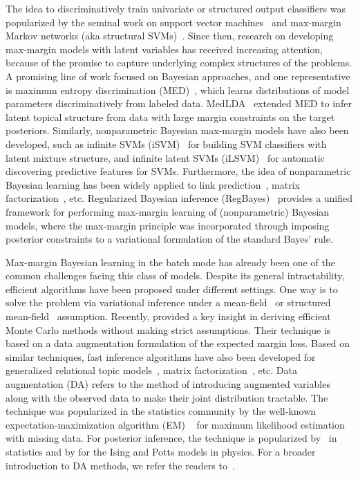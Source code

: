 \documentclass[twoside,11pt]{article}
\newcommand{\strin}[1]{\todo[size=\small, color=green!40]{\bf\sf  #1}}
\begin{document}
The idea to discriminatively train univariate or structured output classifiers was popularized by the seminal work on support vector machines~\citep{Vapnik:95} and max-margin Markov networks (aka structural SVMs)~\citep{koller2003max}. Since then, research on developing max-margin models with latent variables has received increasing attention, because of the promise to capture underlying complex structures of the problems. A promising line of work focused on Bayesian approaches, and one representative is maximum entropy discrimination (MED)~\citep{jaakkola1999maximum,jebara2001discriminative,Zhu:jmlr09}, which learns distributions of model parameters discriminatively from labeled data. MedLDA~\citep{zhu2012medlda} extended MED to infer latent topical structure from data with large margin constraints on the target posteriors. Similarly, nonparametric Bayesian max-margin models have also been developed, such as infinite SVMs (iSVM)~\citep{zhu2011infinite} for building SVM classifiers with latent mixture structure, and infinite latent SVMs (iLSVM)~\citep{zhu2013bayesian} for automatic discovering predictive features for SVMs. Furthermore, the idea of nonparametric Bayesian learning has been widely applied to link prediction~\citep{zhu2012maxlink}, matrix factorization~\citep{xu2013fast}, etc. Regularized Bayesian inference (RegBayes)~\citep{zhu2013bayesian} provides a unified framework for performing max-margin learning of (nonparametric) Bayesian models, where the max-margin principle was incorporated through imposing posterior constraints to a variational formulation of the standard Bayes' rule.

Max-margin Bayesian learning in the batch mode has already been one of the common challenges facing this class of models. Despite its general intractability, efficient algorithms have been proposed under different settings. One way is to solve the problem via variational inference under a mean-field~\citep{zhu2012medlda} or structured mean-field~\citep{jiang2012monte} assumption. Recently, \cite{zhugibbs2013} provided a key insight in deriving efficient Monte Carlo methods without making strict assumptions. Their technique is based on a data augmentation formulation of the expected margin loss. Based on similar techniques, fast inference algorithms have also been developed for generalized relational topic models~\citep{chen2013generalized}, matrix factorization~\citep{xu2013fast}, etc. Data augmentation (DA) refers to the method of introducing augmented variables along with the observed data to make their joint distribution tractable. The technique was popularized in the statistics community by the well-known expectation-maximization algorithm (EM) ~\citep{dempster1977maximum} for maximum likelihood estimation with missing data. For posterior inference, the technique is popularized by~\cite{tanner1987calculation} in statistics and by \cite{swendsen1987nonuniversal} for the Ising and Potts models in physics. For a broader introduction to DA methods, we refer the readers to~\cite{van2001art}.
\end{document}
